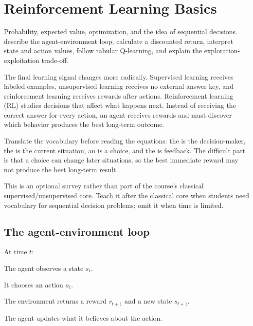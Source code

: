 \chapter{Reinforcement Learning Basics}
\label{ch:rl}

\chapterguide%
  {Probability, expected value, optimization, and the idea of sequential decisions.}
  {describe the agent-environment loop, calculate a discounted return, interpret state and action values, follow tabular Q-learning, and explain the exploration-exploitation trade-off.}

The final learning signal changes more radically. Supervised learning receives labeled examples, unsupervised learning receives no external answer key, and reinforcement learning receives rewards after actions. Reinforcement learning (RL) studies decisions that affect what happens next. Instead of receiving the correct answer for every action, an agent receives rewards and must discover which behavior produces the best long-term outcome.

\begin{firstread}
Translate the vocabulary before reading the equations: the  is the decision-maker, the  is the current situation, an  is a choice, and the  is feedback. The difficult part is that a choice can change later situations, so the best immediate reward may not produce the best long-term result.
\end{firstread}

\begin{optionaltopic}
This is an optional survey rather than part of the course's classical supervised/unsupervised core. Teach it after the classical core when students need vocabulary for sequential decision problems; omit it when time is limited.
\end{optionaltopic}

\section{The agent-environment loop}

At time $t$:

\begin{mlsteps}
  \item The agent observes a state $s_t$.
  \item It chooses an action $a_t$.
  \item The environment returns a reward $r_{t+1}$ and a new state $s_{t+1}$.
  \item The agent updates what it believes about the action.
\end{mlsteps}

